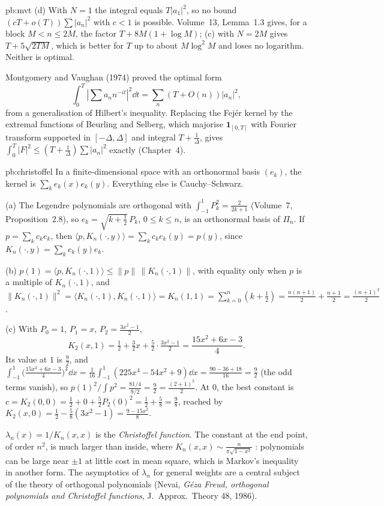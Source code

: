 \begin{solution}{pb:mvt}
(d) With $N=1$ the integral equals $T|a_1|^2$, so no bound $(cT+o(T))\sum|a_n|^2$ with $c<1$ is possible. Volume~13, Lemma~1.3 gives, for a block $M<n\le2M$, the factor
$T+8M(1+\log M)$; (c) with $N=2M$ gives $T+5\sqrt{2TM}$, which is better for $T$ up to about $M\log^2M$ and loses no logarithm. Neither is optimal.

\leads Montgomery and Vaughan (1974) proved the optimal form
\[
\int_0^T|\sum a_nn^{-it}|^2\dd t=\sum_n(T+O(n))|a_n|^2,
\]
from a generalisation of Hilbert's inequality. Replacing the Fejér kernel
by the extremal functions of Beurling and Selberg, which majorise $\mathbf 1_{[0,T]}$ with Fourier transform supported in $[-\Delta,\Delta]$ and integral $T+\frac1\Delta$, gives
$\int_0^T|F|^2\le(T+\frac1\Delta)\sum|a_n|^2$ exactly (Chapter~4).
\end{solution}

\begin{solution}{pb:christoffel}
\idea In a finite-dimensional space with an orthonormal basis $(e_k)$, the kernel is $\sum_ke_k(x)e_k(y)$. Everything else is Cauchy--Schwarz.

\writeup (a) The Legendre polynomials are orthogonal with $\int_{-1}^1P_k^2=\frac2{2k+1}$ (Volume~7, Proposition~2.8), so $e_k=\sqrt{k+\frac12}\,P_k$, $0\le k\le n$, is an orthonormal
basis of $\Pi_n$. If $p=\sum_kc_ke_k$, then $\langle p,K_n(\cdot,y)\rangle=\sum_kc_ke_k(y)=p(y)$, since $K_n(\cdot,y)=\sum_ke_k(y)e_k$.

(b) $p(1)=\langle p,K_n(\cdot,1)\rangle\le\|p\|\,\|K_n(\cdot,1)\|$, with equality only when $p$ is a multiple of $K_n(\cdot,1)$, and
$\|K_n(\cdot,1)\|^2=\langle K_n(\cdot,1),K_n(\cdot,1)\rangle=K_n(1,1)=\sum_{k=0}^n(k+\frac12)=\frac{n(n+1)}2+\frac{n+1}2=\frac{(n+1)^2}2$.

(c) With $P_0=1$, $P_1=x$, $P_2=\frac{3x^2-1}2$,
\[
K_2(x,1)=\tfrac12+\tfrac32x+\tfrac52\cdot\tfrac{3x^2-1}2=\frac{15x^2+6x-3}4.
\]
Its value at $1$ is $\frac92$, and $\int_{-1}^1\bigl(\frac{15x^2+6x-3}4\bigr)^2\dd x=\frac1{16}\int_{-1}^1(225x^4-54x^2+9)\dd x=\frac{90-36+18}{16}=\frac92$ (the odd terms vanish), so
$p(1)^2/\int p^2=\frac{81/4}{9/2}=\frac92=\frac{(2+1)^2}2$. At $0$, the best constant is $c=K_2(0,0)=\frac12+0+\frac52P_2(0)^2=\frac12+\frac58=\frac98$, reached by
$K_2(x,0)=\frac12-\frac58(3x^2-1)=\frac{9-15x^2}8$.

\leads $\lambda_n(x)=1/K_n(x,x)$ is the \emph{Christoffel function}. The constant at the end point, of order $n^2$, is much larger than inside, where
$K_n(x,x)\sim\frac n{\pi\sqrt{1-x^2}}$ : polynomials can be large near $\pm1$ at little cost in mean square, which is Markov's inequality in another form. The asymptotics of
$\lambda_n$ for general weights are a central subject of the theory of orthogonal polynomials (Nevai, \emph{Géza Freud, orthogonal polynomials and Christoffel functions}, J.~Approx.\ Theory 48, 1986).
\end{solution}

